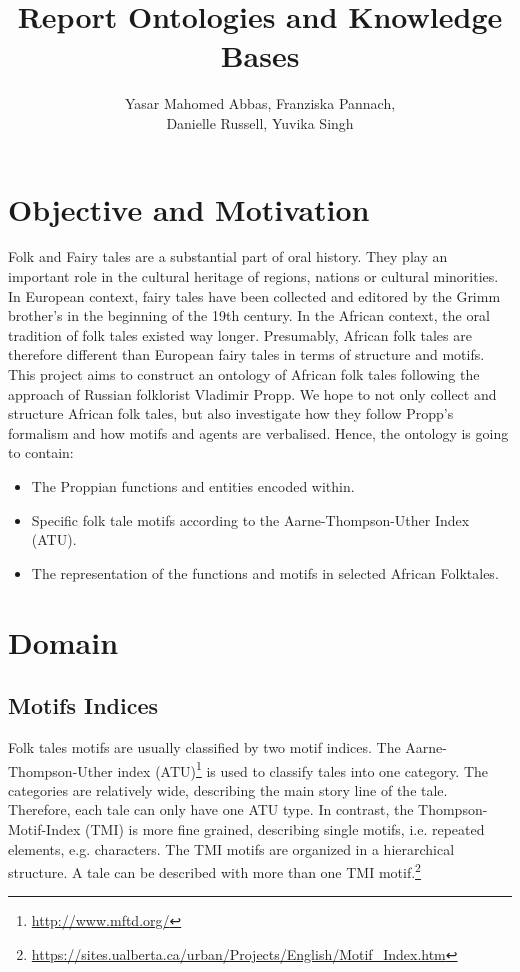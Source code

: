 \documentclass[10pt,a4paper]{article}
\author{Yasar Mahomed Abbas, Franziska Pannach, \\Danielle Russell, Yuvika Singh}
\title{Report Ontologies and Knowledge Bases}
\begin{document}
\maketitle


\section{Objective and Motivation}
Folk and Fairy tales are a substantial part of oral history. They play an important role in the cultural heritage of regions, nations or cultural minorities. In European context, fairy tales have been collected and editored by the Grimm brother's in the beginning of the 19th century.\cite{Grimm1857} In the African context, the oral tradition of folk tales existed way longer. Presumably, African folk tales are therefore different than European fairy tales in terms of structure and motifs. 
This project aims to construct an ontology of African folk tales following the approach of Russian folklorist Vladimir Propp. We hope to not only collect and structure African folk tales, but also investigate how they follow Propp's formalism and how motifs and agents are verbalised.
Hence, the ontology is going to contain: 

\begin{itemize}
	\item The Proppian functions and entities encoded within. 
	\item Specific folk tale motifs according to the Aarne-Thompson-Uther Index (ATU). 
	\item The representation of the functions and motifs in selected African Folktales. 
\end{itemize}


\section{Domain}
	\subsection{Motifs Indices}
	Folk tales motifs are usually classified by two motif indices. The Aarne-Thompson-Uther index (ATU)\footnote{\url{http://www.mftd.org/}} is used to classify tales into one category. The categories are relatively wide, describing the main story line of the tale. Therefore, each tale can only have one ATU type. In contrast, the Thompson-Motif-Index (TMI) is more fine grained, describing single motifs, i.e. repeated elements, e.g. characters. The TMI motifs are organized in a hierarchical structure. A tale can be described with more than one TMI motif.\footnote{\url{https://sites.ualberta.ca/urban/Projects/English/Motif_Index.htm}}    
\end{document}
